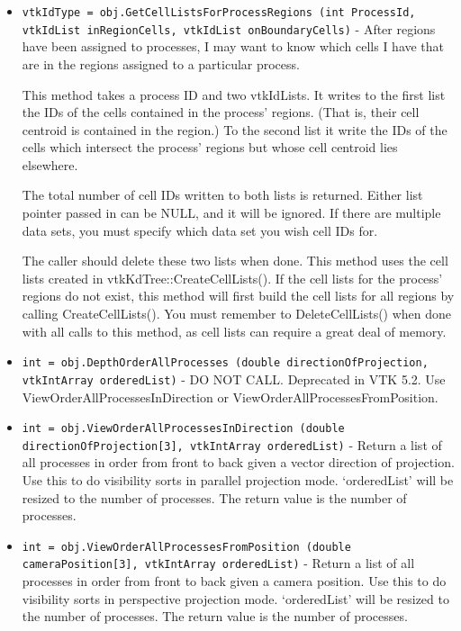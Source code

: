 \begin{itemize}
\item  \verb|vtkIdType = obj.GetCellListsForProcessRegions (int ProcessId, vtkIdList inRegionCells, vtkIdList onBoundaryCells)| -    After regions have been assigned to processes, I may want to know
   which cells I have that are in the regions assigned to a particular
   process.

   This method takes a process ID and two vtkIdLists.  It
   writes to the first list the IDs of the cells
   contained in the process' regions.  (That is, their cell
   centroid is contained in the region.)  To the second list it
   write the IDs of the cells which intersect the process' regions 
   but whose cell centroid lies elsewhere.

   The total number of cell IDs written to both lists is returned.  
   Either list pointer passed in can be NULL, and it will be ignored. 
   If there are multiple data sets, you must specify which data set
   you wish cell IDs for.  

   The caller should delete these two lists when done.  This method 
   uses the cell lists created in vtkKdTree::CreateCellLists().
   If the cell lists for the process' regions do not exist, this
   method will first build the cell lists for all regions by calling
   CreateCellLists().  You must remember to DeleteCellLists() when 
   done with all calls to this method, as cell lists can require a 
   great deal of memory.  

\item  \verb|int = obj.DepthOrderAllProcesses (double directionOfProjection, vtkIntArray orderedList)| -  DO NOT CALL.  Deprecated in VTK 5.2.  Use ViewOrderAllProcessesInDirection
 or ViewOrderAllProcessesFromPosition.

\item  \verb|int = obj.ViewOrderAllProcessesInDirection (double directionOfProjection[3], vtkIntArray orderedList)| -  Return a list of all processes in order from front to back given a
 vector direction of projection.  Use this to do visibility sorts
 in parallel projection mode. `orderedList' will be resized to the number
 of processes. The return value is the number of processes.
 

\item  \verb|int = obj.ViewOrderAllProcessesFromPosition (double cameraPosition[3], vtkIntArray orderedList)| -  Return a list of all processes in order from front to back given a
 camera position.  Use this to do visibility sorts in perspective
 projection mode. `orderedList' will be resized to the number
 of processes. The return value is the number of processes.
 


\end{itemize}
